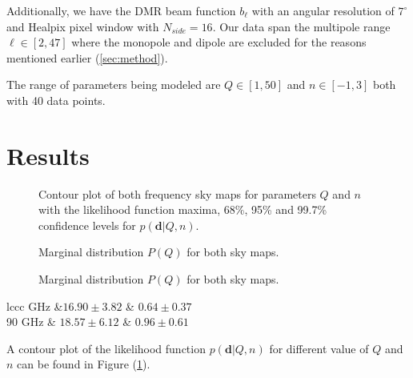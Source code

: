 \documentclass{emulateapj}
\begin{document}
Additionally, we have the DMR beam function $b_{\ell}$ with an angular resolution of $7^{\circ}$ and Healpix pixel window with $N_{side} = 16$. Our data span the multipole range $\ell \in [2,47]$ where the monopole and dipole are excluded for the reasons mentioned earlier (\ref{sec:method}).  

The range of parameters being modeled are $Q \in [1,50]$ and $n \in [-1,3]$ both with 40 data points.





\section{Results}
\label{sec:results}

\begin{figure}[t]
	
	\mbox{}
	
	\caption{Contour plot of both frequency sky maps for parameters $Q$ and $n$ with the likelihood function maxima, 68\%, 95\% and 99.7\% confidence levels for $p(\textbf{d}|Q,n)$. }
	\label{fig:contour}
\end{figure}

\begin{figure}[t]	
	\mbox{}	
	\caption{Marginal distribution $P(Q)$ for both sky maps.}
	\label{fig:PQ}
\end{figure}

\begin{figure}[t]	
	\mbox{}	
	\caption{Marginal distribution $P(Q)$ for both sky maps.}
	\label{fig:Pn}
\end{figure}


\begin{deluxetable}{lccc}
	\tablecaption{\label{tab:results}}
	 GHz &$16.90 \pm 3.82$ & $0.64 \pm  0.37$ \\
	90 GHz & $ 18.57 \pm 6.12$ & $0.96 \pm 0.61$  \\
		\enddata
\end{deluxetable}

A contour plot of the likelihood function $p(\textbf{d}|Q,n)$ for different value of $Q$ and $n$ can be found in Figure (\ref{fig:contour}).
\end{document}
